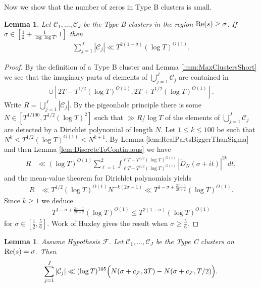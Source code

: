 \documentclass[12pt]{amsart}
\theoremstyle{plain}
\newtheorem{lemma}[theorem]{Lemma}
\theoremstyle{definition}
\theoremstyle{remark}
\begin{document}
%
%
%
%
Now we show that the number of zeros in Type B clusters is small.
%
%
%
%
\begin{lemma}\label{lmm:exceptionalClusters}
Let $\mathcal{C}_1,\ldots,\mathcal{C}_J$ be the Type B clusters in the region $\textup{Re}(s)\geq\sigma$. If $\sigma \in [\frac{1}{2} + \frac{1}{\log \log T}, 1]$ then
\begin{align*}
\sum_{j=1}^J |\mathcal{C}_j| \ll T^{2(1-\sigma)}(\log T)^{O(1)}.
\end{align*}
\end{lemma}
%
%
%
%
\begin{proof}
By the definition of a Type B cluster and Lemma \ref{lmm:MaxClustersShort} we see that the imaginary parts of elements of $\bigcup_{j=1}^J \mathcal{C}_j$ are contained in
\begin{align*}
[T - T^{1/2}(\log T)^{O(1)},T + T^{1/2}(\log T)^{O(1)}] \cup [2T - T^{1/2}(\log T)^{O(1)},2T + T^{1/2}(\log T)^{O(1)}].
\end{align*}
Write $R = \bigcup_{j=1}^J |\mathcal{C}_j|$. By the pigeonhole principle there is some $N \in [T^{1/100},T^{1/2}(\log T)^2]$ such that $\gg R/\log T$ of the elements of $\bigcup_{j=1}^J \mathcal{C}_j$ are detected by a Dirichlet polynomial of length $N$. Let $1\leq k\leq 100$ be such that $N^k \leq T^{1/2}(\log T)^{O(1)}\leq N^{k+1}$. By Lemma \ref{lem:RealPartsBiggerThanSigma} and then Lemma \ref{lem:DiscreteToContinuous} we have
\begin{align*}
R &\ll (\log T)^{O(1)}\sum_{\ell=1}^2 \int_{\ell T - T^{1/2}(\log T)^{O(1)}}^{\ell T + T^{1/2}(\log T)^{O(1)}} |\widetilde{D}_N(\sigma+it)|^{2k} dt,
\end{align*}
and the mean-value theorem for Dirichlet polynomials \cite[Theorem 9.1]{IK2004} yields
\begin{align*}
R &\ll T^{1/2}(\log T)^{O(1)} N^{-k(2\sigma-1)} \ll T^{1-\sigma + \frac{2\sigma-1}{2k+2}} (\log T)^{O(1)}.
\end{align*}
Since $k\geq 1$ we deduce
\begin{align*}
T^{1-\sigma + \frac{2\sigma-1}{2k+2}} (\log T)^{O(1)} \leq T^{2(1-\sigma)}(\log T)^{O(1)}
\end{align*}
for $\sigma \in [\frac{1}{2},\frac{5}{6}]$. Work of Huxley \cite{Hux1972} gives the result when $\sigma \geq \frac{5}{6}$.
\end{proof}
%
%
%
%
\begin{lemma}\label{lmm:TypeCClusters}
Assume Hypothesis $\mathcal{F}$. Let $\mathcal{C}_1,\dots,\mathcal{C}_J$ be the Type C clusters on $\textup{Re}(s)=\sigma$. Then
\[
\sum_{j=1}^J|\mathcal{C}_j|\ll (\log{T})^{105}\Bigl(N(\sigma+c_\mathcal{F},3T)-N(\sigma+c_\mathcal{F},T/2)\Bigr).
\]
\end{lemma}
\end{document}
